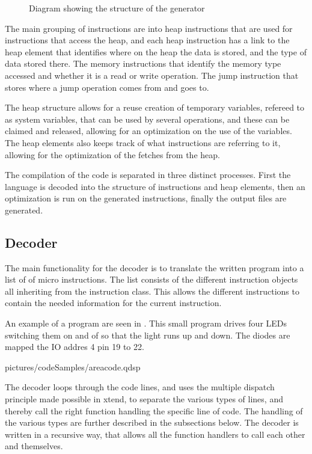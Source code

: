 \begin{figure}[H]
	\centering
		\scalebox{0.7}{}
		\caption{Diagram showing the structure of the generator}
		\label{fig:classdiagram}
\end{figure}

The main grouping of instructions are into heap instructions that are used for instructions that access the heap, and each heap instruction has a link to the heap element that identifies where on the heap the data is stored, and the type of data stored there. The memory instructions that identify the memory type accessed and whether it is a read or write operation. The jump instruction that stores where a jump operation comes from and goes to.

The heap structure allows for a reuse creation of temporary variables, refereed to as system variables, that can be used by several operations, and these can be claimed and released, allowing for an optimization on the use of the variables. The heap elements also keeps track of what instructions are referring to it, allowing for the optimization of the fetches from the heap.

The compilation of the code is separated in three distinct processes. First the language is decoded into the structure of instructions and heap elements, then an optimization is run on the generated instructions, finally the output files are generated.


\subsection{Decoder}
The main functionality for the decoder is to translate the written program into a list of of micro instructions. The list consists of the different instruction objects all inheriting from the instruction class. This allows the different instructions to contain the needed information for the current instruction. 

An example of a program are seen in . This small program drives four LEDs  switching them on and of so that the light runs up and down. The diodes are mapped the IO addres 4 pin 19 to 22.


  {pictures/codeSamples/areacode.qdsp}
	
The decoder loops through the code lines, and uses the multiple dispatch principle made ​​possible in xtend, to separate the various types of lines, and thereby call the right function handling the specific line of code. The handling of the various types are further described in the subsections below. The decoder is written in a recursive way, that allows all the function handlers to call each other and themselves.


